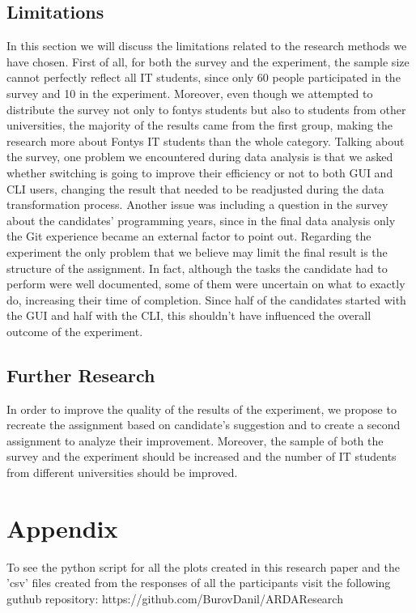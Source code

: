 \documentclass[]{report}
\begin{document}
	\subsection{Limitations}
	In this section we will discuss the limitations related to the research methods we have chosen.
	First of all, for both the survey and the experiment, the sample size cannot perfectly reflect all IT students, since only 60 people participated in the survey and 10 in the experiment.
	Moreover, even though we attempted to distribute the survey not only to fontys students but also to students from other universities, the majority of the results came from the first group, making the research more about Fontys IT students than the whole category.
	Talking about the survey, one problem we encountered during data analysis is that we asked whether switching is going to improve their efficiency or not to both GUI and CLI users, changing the result that needed to be readjusted during the data transformation process. Another issue was including a question in the survey about the candidates' programming years, since in the final data analysis only the Git experience became an external factor to point out.
	Regarding the experiment the only problem that we believe may limit the final result is the structure of the assignment. In fact, although the tasks the candidate had to perform were well documented, some of them were uncertain on what to exactly do, increasing their time of completion. Since half of the candidates started with the GUI and half with the CLI, this shouldn't have influenced the overall outcome of the experiment.
	
	\subsection{Further Research}
	In order to improve the quality of the results of the experiment, we propose to recreate the assignment based on candidate's suggestion and to create a second assignment to analyze their improvement. Moreover, the sample of both the survey and the experiment should be increased and the number of IT students from different universities should be improved. \newpage
	
\printbibliography[title=References]
\newpage
	
	\section{Appendix}
	
	To see the python script for all the plots created in this research paper and the 'csv' files created from the responses of all the participants visit the following guthub repository: https://github.com/BurovDanil/ARDAResearch
	
\end{document}
